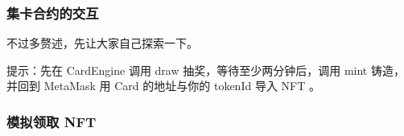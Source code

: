 \documentclass{beamer}
\begin{document}
\begin{frame}
    \frametitle{集卡合约的交互}

    不过多赘述，先让大家自己探索一下。

    提示：先在 CardEngine 调用 draw 抽奖，等待至少两分钟后，调用 mint 铸造，并回到 MetaMask 用 Card 的地址与你的 tokenId 导入 NFT 。

\end{frame}

\begin{frame}
    \frametitle{模拟领取 NFT}

    

\end{frame}
\end{document}
